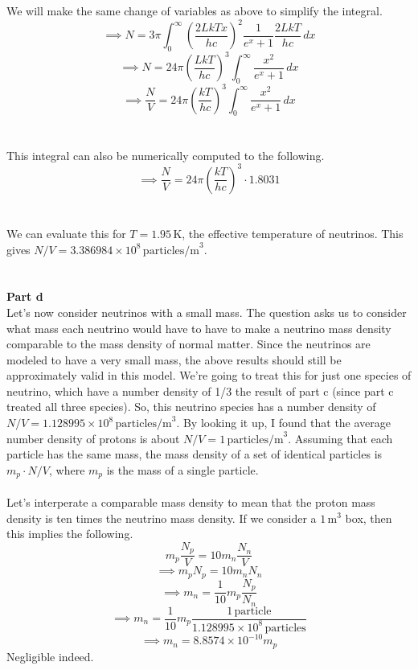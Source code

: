 \documentclass[12pt]{article}
\begin{document}
\begin{flushleft}
We will make the same change of variables as above to simplify the integral.
$$\implies N=3\pi\int_0^\infty\left(\frac{2LkTx}{hc}\right)^2\frac{1}{e^{x}+1}\frac{2LkT}{hc}\,dx$$
$$\implies N=24\pi\left(\frac{LkT}{hc}\right)^3\int_0^\infty\frac{x^2}{e^{x}+1}\,dx$$
$$\implies \frac{N}{V}=24\pi\left(\frac{kT}{hc}\right)^3\int_0^\infty\frac{x^2}{e^{x}+1}\,dx$$\\~\\
This integral can also be numerically computed to the following.
$$\implies \frac{N}{V}=24\pi\left(\frac{kT}{hc}\right)^3\cdot1.8031$$\\~\\

We can evaluate this for $T=1.95\,\text{K}$, the effective temperature of neutrinos.
This gives $N/V=3.386984\times10^8\,\text{particles/m}^3$.\\~\\~\\




\textbf{Part d}\\
Let's now consider neutrinos with a small mass.
The question asks us to consider what mass each neutrino would have to have to make a neutrino mass density comparable to the mass density of normal matter.
Since the neutrinos are modeled to have a very small mass, the above results should still be approximately valid in this model.
We're going to treat this for just one species of neutrino, which have a number density of 1/3 the result of part c (since part c treated all three species).
So, this neutrino species has a number density of $N/V=1.128995\times10^8\,\text{particles/m}^3$.
By looking it up, I found that the average number density of protons is about $N/V=1\,\text{particles/m}^3$.
Assuming that each particle has the same mass, the mass density of a set of identical particles is $m_p\cdot N/V$, where $m_p$ is the mass of a single particle.\\~\\

Let's interperate a comparable mass density to mean that the proton mass density is ten times the neutrino mass density.
If we consider a $1\,\text{m}^3$ box, then this implies the following.
$$m_p\frac{N_p}{V}=10m_n\frac{N_n}{V}$$
$$\implies m_pN_p=10m_nN_n$$
$$\implies m_n=\frac{1}{10}m_p\frac{N_p}{N_n}$$
$$\implies m_n=\frac{1}{10}m_p\frac{1\,\text{particle}}{1.128995\times10^8\,\text{particles}}$$
$$\implies m_n=8.8574\times10^{-10}m_p$$
Negligible indeed.



\end{flushleft}
\end{document}
